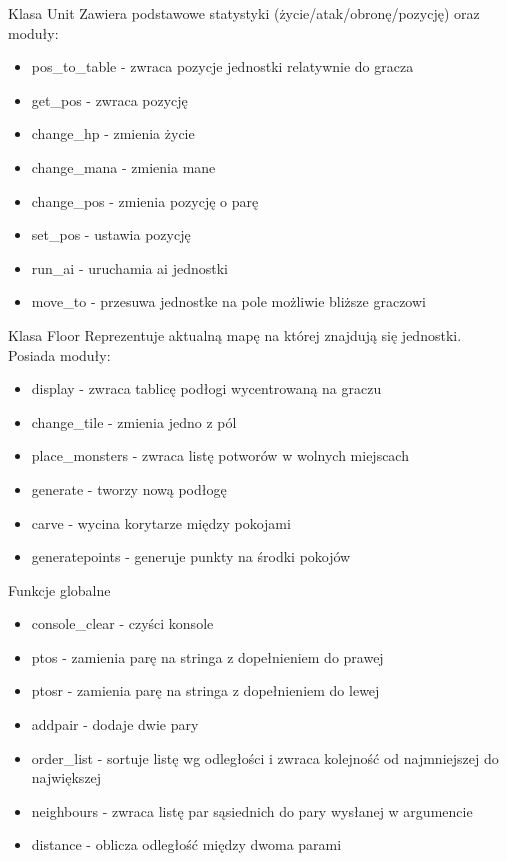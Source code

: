 \documentclass{beamer}
\begin{document}
\begin{frame}{Klasa Unit}
Zawiera podstawowe statystyki (życie/atak/obronę/pozycję) oraz moduły:
\begin{itemize}
\item pos\_to\_table - zwraca pozycje jednostki relatywnie do gracza
\item get\_pos - zwraca pozycję
\item change\_hp - zmienia życie
\item change\_mana - zmienia mane
\item change\_pos - zmienia pozycję o parę
\item set\_pos - ustawia pozycję
\item run\_ai - uruchamia ai jednostki
\item move\_to - przesuwa jednostke na pole możliwie bliższe graczowi
\end{itemize}
\end{frame}
\begin{frame}{Klasa Floor}
Reprezentuje aktualną mapę na której znajdują się jednostki. Posiada moduły:
\begin{itemize}
\item display - zwraca tablicę podłogi wycentrowaną na graczu
\item change\_tile - zmienia jedno z pól
\item place\_monsters - zwraca listę potworów w wolnych miejscach
\item generate - tworzy nową podłogę
\item carve - wycina korytarze między pokojami
\item generatepoints - generuje punkty na środki pokojów
\end{itemize}
\end{frame}
\begin{frame}{Funkcje globalne}
\begin{itemize}
\item console\_clear - czyści konsole
\item ptos - zamienia parę na stringa z dopełnieniem do prawej
\item ptosr - zamienia parę na stringa z dopełnieniem do lewej
\item addpair - dodaje dwie pary
\item order\_list - sortuje listę wg odległości i zwraca kolejność od najmniejszej do największej
\item neighbours - zwraca listę par sąsiednich do pary wysłanej w argumencie
\item distance - oblicza odległość między dwoma parami
\end{itemize}
\end{frame}
\end{document}
